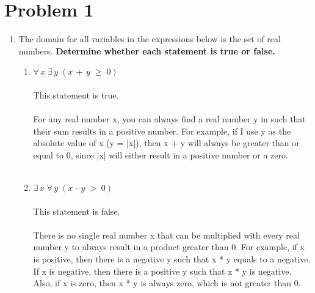 \documentclass{amsart}
\theoremstyle{definition}
\theoremstyle{Exercise}
\theoremstyle{remark}
\theoremstyle{rule}
\numberwithin{equation}{section}
\begin{document}
\section*{Problem 1}
\begin{enumerate}[label=(\alph*)]
\item The domain for all variables in the expressions below is the set of real numbers. {\bf Determine whether each statement is true or false.}
\begin{enumerate}[label=(\roman*)]
  \item $\forall\, x\; \exists \,y\;(x\,+\,y\;\geq \;0)$
\\\\
This statement is true. 
\\\\
For any real number x, you can always find a real number y in such that their sum results in a positive number. For example, if I use y as the absolute value of x (y = |x|), then x + y will always be greater than or equal to 0, since |x| will either result in a positive number or a zero.
\\\\
  \item $\exists \, x\; \forall \,y\;(x\,\cdot\,y\;>\; 0)$
   \\\\
This statement is false. 
\\\\
There is no single real number x that can be multiplied with every real number y to always result in a product greater than 0. For example, if x is positive, then there is a negative y such that x * y equals to a negative. If x is negative, then there is a positive y such that x * y is negative. Also, if x is zero, then x * y is always zero, which is not greater than 0.
\\\\
\end{enumerate}


\end{enumerate}
\end{document}
